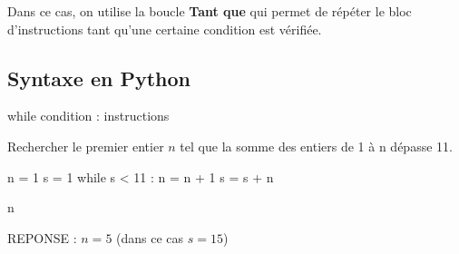 Dans ce cas, on utilise la boucle \textbf{Tant que} qui permet de répéter le bloc d'instructions 
tant qu'une certaine condition est vérifiée.


\vspace{1cm}



\subsection{Syntaxe en Python}


\begin{pyverbatim}
while condition :
    instructions
\end{pyverbatim}



\vspace{0.5cm}
\label{ex-suite}
Rechercher le premier entier $n$ tel que la somme des entiers de 1 à n dépasse 11.

\begin{pyconsole}
n = 1
s = 1
while s < 11 :
    n = n + 1
    s = s + n
    
n
\end{pyconsole}

\begin{center}
REPONSE  : $n=5$  (dans ce cas $s=15$)
\end{center}

